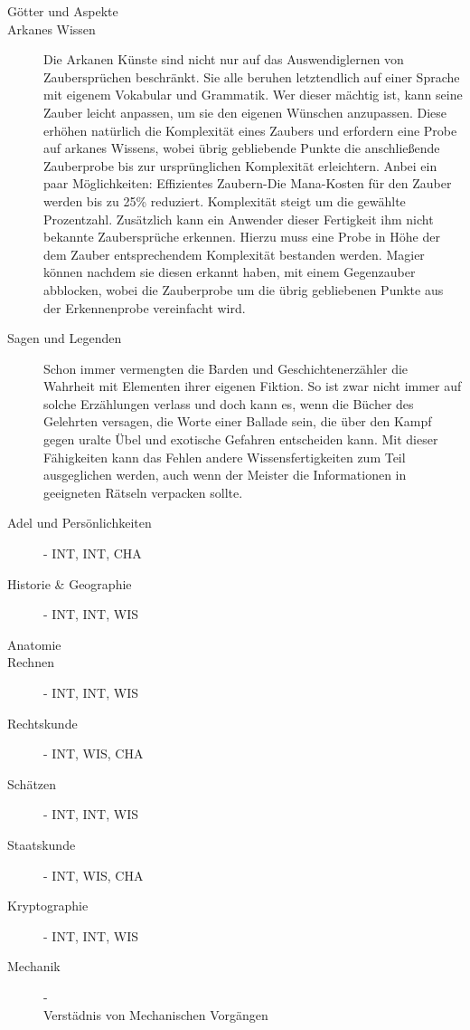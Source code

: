 \documentclass[a4paper,12pt,oneside]{book}
\begin{document}
\begin{description}
\item[Götter und Aspekte]
\item[Arkanes Wissen]Die Arkanen Künste sind nicht nur auf das Auswendiglernen von Zaubersprüchen beschränkt. Sie alle beruhen letztendlich auf einer Sprache mit eigenem Vokabular und Grammatik. Wer dieser mächtig ist, kann seine Zauber leicht anpassen, um sie den eigenen Wünschen anzupassen. Diese erhöhen natürlich die Komplexität eines Zaubers und erfordern eine Probe auf arkanes Wissens, wobei übrig gebliebende Punkte die anschließende Zauberprobe bis zur ursprünglichen Komplexität erleichtern. Anbei ein paar Möglichkeiten:
Effizientes Zaubern-Die Mana-Kosten für den Zauber werden bis zu 25\% reduziert. Komplexität steigt um die gewählte Prozentzahl.
Zusätzlich kann ein Anwender dieser Fertigkeit ihm nicht bekannte Zaubersprüche erkennen. Hierzu muss eine Probe in Höhe der dem Zauber entsprechendem Komplexität bestanden werden. Magier können nachdem sie diesen erkannt haben, mit einem Gegenzauber abblocken, wobei die Zauberprobe um die übrig gebliebenen Punkte aus der Erkennenprobe vereinfacht wird.
\item[Sagen und Legenden]Schon immer vermengten die Barden und Geschichtenerzähler die Wahrheit mit Elementen ihrer eigenen Fiktion. So ist zwar nicht immer auf solche Erzählungen verlass und doch kann es, wenn die Bücher des Gelehrten versagen, die Worte einer Ballade sein, die über den Kampf gegen uralte Übel und exotische Gefahren entscheiden kann. Mit dieser Fähigkeiten kann das Fehlen andere Wissensfertigkeiten zum Teil ausgeglichen werden, auch wenn der Meister die Informationen in geeigneten Rätseln verpacken sollte.
\item[Adel und Persönlichkeiten]- INT, INT, CHA
\item[Historie \& Geographie]- INT, INT, WIS
\item[Anatomie]
\item[Rechnen]- INT, INT, WIS
\item[Rechtskunde]- INT, WIS, CHA
\item[Schätzen]- INT, INT, WIS
\item[Staatskunde]- INT, WIS, CHA
\item[Kryptographie]- INT, INT, WIS
\item[Mechanik]-
\\Verstädnis von Mechanischen Vorgängen 
\end{description}
\end{document}
